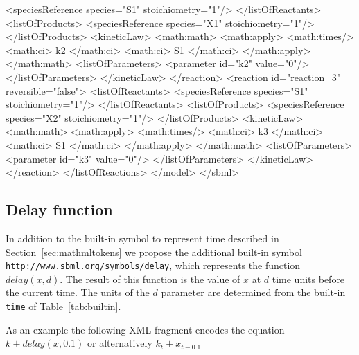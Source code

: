 \documentclass[10pt,twocolumntoc]{cekarticle}
\newcommand{\vref}[1]{\ref{#1}}
\begin{document}
\begin{example}
                    <speciesReference species="S1" stoichiometry="1"/>
                </listOfReactants>
                <listOfProducts>
                    <speciesReference species="X1" stoichiometry="1"/>
                </listOfProducts>
                <kineticLaw>
                    <math:math>
                        <math:apply>
                            <math:times/>
                            <math:ci> k2 </math:ci>
                            <math:ci> S1 </math:ci>
                        </math:apply>
                    </math:math>
                    <listOfParameters>
                        <parameter id="k2" value="0"/>
                    </listOfParameters>
                </kineticLaw>
            </reaction>
            <reaction id="reaction_3" reversible="false">
                <listOfReactants>
                    <speciesReference species="S1" stoichiometry="1"/>
                </listOfReactants>
                <listOfProducts>
                    <speciesReference species="X2" stoichiometry="1"/>
                </listOfProducts>
                <kineticLaw>
                    <math:math>
                        <math:apply>
                            <math:times/>
                            <math:ci> k3 </math:ci>
                            <math:ci> S1 </math:ci>
                        </math:apply>
                    </math:math>
                    <listOfParameters>
                        <parameter id="k3" value="0"/>
                    </listOfParameters>
                </kineticLaw>
            </reaction>
        </listOfReactions>
    </model>
</sbml>
\end{example}
\subsection{Delay function}
\label{sec:delay}

In addition to the built-in symbol to represent time described in Section~\ref{sec:mathmltokens} we propose the additional built-in symbol \texttt{http://www.sbml.org/symbols/delay}, which represents the function $delay(x, d)$.  The result of this function is the value of $x$ at $d$ time units before the current time.  The units of the $d$ parameter are determined from the built-in \texttt{time} of Table~\vref{tab:builtin}.

As an example the following XML fragment encodes the equation $k + delay(x, 0.1)$ or alternatively $k_t + x_{t - 0.1}$
\end{document}
